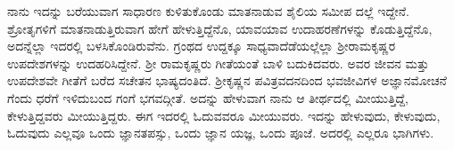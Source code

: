 ನಾನು ಇದನ್ನು ಬರೆಯುವಾಗ ಸಾಧಾರಣ ಕುಳಿತುಕೊಂಡು ಮಾತನಾಡುವ ಶೈಲಿಯ ಸಮೀಪ ದಲ್ಲೆ ಇದ್ದೇನೆ. ಶ್ರೋತೃಗಳಿಗೆ ಮಾತನಾಡುತ್ತಿರುವಾಗ ಹೇಗೆ ಹೇಳುತ್ತಿದ್ದೆನೊ, ಯಾವಯಾವ ಉದಾಹರಣೆಗಳನ್ನು ಕೊಡುತ್ತಿದ್ದೆನೊ, ಅದನ್ನೆಲ್ಲಾ ಇದರಲ್ಲಿ ಬಳಸಿಕೊಂಡಿರುವೆನು. ಗ್ರಂಥದ ಉದ್ದಕ್ಕೂ ಸಾಧ್ಯವಾದೆಡೆಯಲ್ಲೆಲ್ಲಾ ಶ್ರೀರಾಮಕೃಷ್ಣರ ಉಪದೇಶಗಳನ್ನು ಉದಹರಿಸಿದ್ದೇನೆ. ಶ್ರೀ ರಾಮಕೃಷ್ಣರು ಗೀತೆಯಂತೆ ಬಾಳಿ ಬದುಕಿದವರು. ಅವರ ಜೀವನ ಮತ್ತು ಉಪದೇಶವೇ ಗೀತೆಗೆ ಬರೆದ ಸಚೇತನ ಭಾಷ್ಯದಂತಿದೆ. ಶ್ರೀಕೃಷ್ಣನ ಪವಿತ್ರವದನದಿಂದ ಭವಜೀವಿಗಳ ಅಜ್ಞಾನಮೋಚನೆ ಗೆಂದು ಧರೆಗೆ ಇಳಿದುಬಂದ ಗಂಗೆ ಭಗವದ್ಗೀತೆ. ಅದನ್ನು ಹೇಳುವಾಗ ನಾನು ಆ ತೀರ್ಥದಲ್ಲಿ ಮೀಯುತ್ತಿದ್ದೆ, ಕೇಳುತ್ತಿದ್ದವರು ಮೀಯುತ್ತಿದ್ದರು. ಈಗ ಇದರಲ್ಲಿ ಓದುವವರೂ ಮೀಯುವರು. ಇದನ್ನು ಹೇಳುವುದು, ಕೇಳುವುದು, ಓದುವುದು ಎಲ್ಲವೂ ಒಂದು ಜ್ಞಾನತಪಸ್ಸು, ಒಂದು ಜ್ಞಾನ ಯಜ್ಞ, ಒಂದು ಪೂಜೆ. ಅದರಲ್ಲಿ ಎಲ್ಲರೂ ಭಾಗಿಗಳು.


